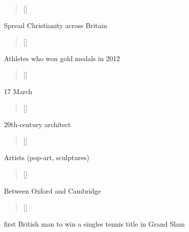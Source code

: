\documentclass[grid,avery5371]{flashcards}
\begin{document}
\begin{flashcard}[]{%
\begin{verse}[\versewidth]
\end{verse}}

Spread Christianity across Britain

\end{flashcard}

\begin{flashcard}[]{%
\begin{verse}[\versewidth]
\end{verse}}

Athletes who won gold medals in 2012

\end{flashcard}

\begin{flashcard}[]{%
\begin{verse}[\versewidth]
\end{verse}}

17 March

\end{flashcard}

\begin{flashcard}[]{%
\begin{verse}[\versewidth]
\end{verse}}

20th-century architect

\end{flashcard}

\begin{flashcard}[]{%
\begin{verse}[\versewidth]
\end{verse}}

Artists (pop-art, sculptures)

\end{flashcard}

\begin{flashcard}[]{%
\begin{verse}[\versewidth]
\end{verse}}

Between Oxford and Cambridge

\end{flashcard}

\begin{flashcard}[]{%
\begin{verse}[\versewidth]
\end{verse}}

first British man to win a singles tennis title in Grand Slam 

\end{flashcard}
\end{document}
